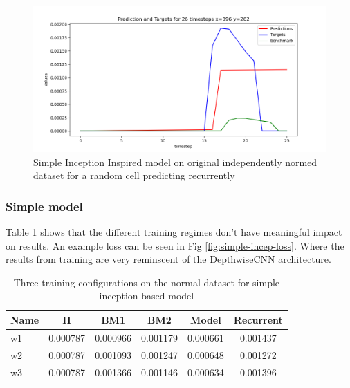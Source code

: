 \begin{figure}[tbph]
	\centering
	\includegraphics[width=0.8\linewidth, height=0.3\textheight]{Figures/Results/Inception_model/simple_incep_train_5_custom_mae_weighted_10_norm_independant_normal_292_random_cell_residual}
	\caption[Simple Inception Inspired model on original independently normed dataset]{Simple Inception Inspired model on original independently normed dataset for a random cell predicting recurrently}
	\label{fig:eg-simpincep}
\end{figure}


\subsubsection*{Simple model}
Table \ref{tab:simple_normal} shows that the different training regimes don't have meaningful impact on results. An example loss can be seen in Fig \ref{fig:simple-incep-loss}. Where the results from training are very reminscent of the DepthwiseCNN architecture. 
\begin{table}[htbp]
	\centering
	\caption{Three training configurations on the normal dataset for simple inception based model}
	\label{tab:simple_normal}
	\begin{tabular}{p{2cm}ccccc}
		\toprule
		Name &  H &  BM1 &  BM2 &  Model &  Recurrent \\
		\midrule
		w1 &       0.000787 &        0.000966 &        0.001179 &   0.000661 &            0.001437 \\
		w2 &       0.000787 &        0.001093 &        0.001247 &   0.000648 &            0.001272 \\
		w3 &       0.000787 &        0.001366 &        0.001146 &   0.000634 &            0.001396 \\
		\bottomrule
	\end{tabular}
\end{table}


